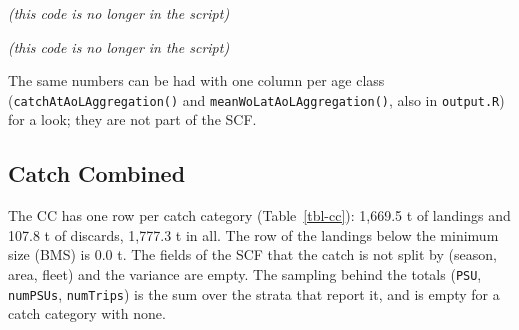\documentclass[
  a4paper,
  DIV=11,
  numbers=noendperiod]{scrartcl}
\newcounter{none} %
\begin{document}
\emph{(this code is no longer in the script)}

\emph{(this code is no longer in the script)}

The same numbers can be had with one column per age class
(\texttt{catchAtAoLAggregation()} and
\texttt{meanWoLatAoLAggregation()}, also in \texttt{output.R}) for a
look; they are not part of the SCF.

\subsection{Catch Combined}\label{catch-combined}

The CC has one row per catch category (Table~\ref{tbl-cc}): 1,669.5 t of
landings and 107.8 t of discards, 1,777.3 t in all. The row of the
landings below the minimum size (BMS) is 0.0 t. The fields of the SCF
that the catch is not split by (season, area, fleet) and the variance
are empty. The sampling behind the totals (\texttt{PSU},
\texttt{numPSUs}, \texttt{numTrips}) is the sum over the strata that
report it, and is empty for a catch category with none.
\end{document}
